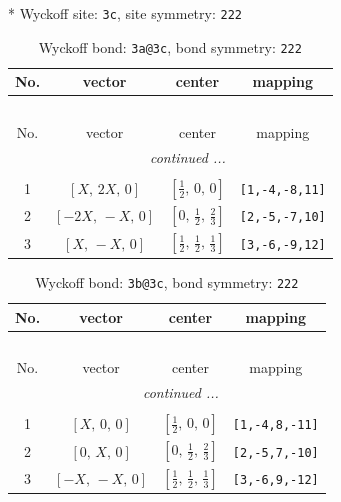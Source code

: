 \documentclass[fleqn,8pt]{jsarticle}
\begin{document}
* Wyckoff site: {\tt 3c}, site symmetry: {\tt 222}
\renewcommand{\arraystretch}{1.2}
\begin{longtable}{cccc}
\caption{Wyckoff bond: {\tt 3a@3c}, bond symmetry: {\tt 222}}
 \\
 \hline \hline
No. & vector & center & mapping \\ \hline \endfirsthead

\multicolumn{3}{l}{\tablename\ \thetable{}} \\
 \hline \hline
No. & vector & center & mapping \\ \hline \endhead

 \hline \hline
\multicolumn{3}{r}{\footnotesize\it continued ...} \\ \endfoot

 \hline \hline
\multicolumn{3}{r}{} \\ \endlastfoot

1 & $\left[ X,\, 2 X,\, 0 \right]$ & $\left[ \frac{1}{2},\, 0,\, 0 \right]$ & {\tt [1,-4,-8,11]} \\ \hline
2 & $\left[ - 2 X,\, - X,\, 0 \right]$ & $\left[ 0,\, \frac{1}{2},\, \frac{2}{3} \right]$ & {\tt [2,-5,-7,10]} \\ \hline
3 & $\left[ X,\, - X,\, 0 \right]$ & $\left[ \frac{1}{2},\, \frac{1}{2},\, \frac{1}{3} \right]$ & {\tt [3,-6,-9,12]} \\
\end{longtable}
\renewcommand{\arraystretch}{1.2}
\begin{longtable}{cccc}
\caption{Wyckoff bond: {\tt 3b@3c}, bond symmetry: {\tt 222}}
 \\
 \hline \hline
No. & vector & center & mapping \\ \hline \endfirsthead

\multicolumn{3}{l}{\tablename\ \thetable{}} \\
 \hline \hline
No. & vector & center & mapping \\ \hline \endhead

 \hline \hline
\multicolumn{3}{r}{\footnotesize\it continued ...} \\ \endfoot

 \hline \hline
\multicolumn{3}{r}{} \\ \endlastfoot

1 & $\left[ X,\, 0,\, 0 \right]$ & $\left[ \frac{1}{2},\, 0,\, 0 \right]$ & {\tt [1,-4,8,-11]} \\ \hline
2 & $\left[ 0,\, X,\, 0 \right]$ & $\left[ 0,\, \frac{1}{2},\, \frac{2}{3} \right]$ & {\tt [2,-5,7,-10]} \\ \hline
3 & $\left[ - X,\, - X,\, 0 \right]$ & $\left[ \frac{1}{2},\, \frac{1}{2},\, \frac{1}{3} \right]$ & {\tt [3,-6,9,-12]} \\
\end{longtable}
\end{document}
